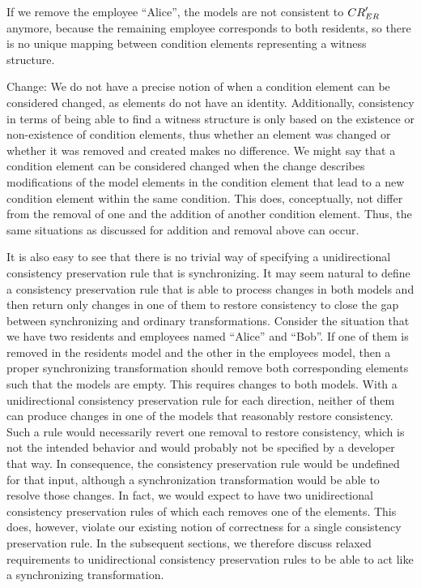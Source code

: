 \begin{properdescription}
    If we remove the employee \enquote{Alice}, the models are not consistent to $\consistencyrelation{CR}{ER}'$ anymore, because the remaining employee corresponds to both residents, so there is no unique mapping between condition elements representing a witness structure.
    \item[Change:] We do not have a precise notion of when a condition element can be considered changed, as elements do not have an identity. 
    Additionally, consistency in terms of being able to find a witness structure is only based on the existence or non-existence of condition elements, thus whether an element was changed or whether it was removed and created makes no difference.
    We might say that a condition element can be considered changed when the change describes modifications of the model elements in the condition element that lead to a new condition element within the same condition.
    This does, conceptually, not differ from the removal of one and the addition of another condition element.
    Thus, the same situations as discussed for addition and removal above can occur.
\end{properdescription}

It is also easy to see that there is no trivial way of specifying a unidirectional consistency preservation rule that is synchronizing.
It may seem natural to define a consistency preservation rule that is able to process changes in both models and then return only changes in one of them to restore consistency to close the gap between synchronizing and ordinary transformations.
Consider the situation that we have two residents and employees named \enquote{Alice} and \enquote{Bob}.
If one of them is removed in the residents model and the other in the employees model, then a proper synchronizing transformation should remove both corresponding elements such that the models are empty.
This requires changes to both models.
With a unidirectional consistency preservation rule for each direction, neither of them can produce changes in one of the models that reasonably restore consistency.
Such a rule would necessarily revert one removal to restore consistency, which is not the intended behavior and would probably not be specified by a developer that way.
In consequence, the consistency preservation rule would be undefined for that input, although a synchronization transformation would be able to resolve those changes.
In fact, we would expect to have two unidirectional consistency preservation rules of which each removes one of the elements.
This does, however, violate our existing notion of correctness for a single consistency preservation rule.
In the subsequent sections, we therefore discuss relaxed requirements to unidirectional consistency preservation rules to be able to act like a synchronizing transformation.


